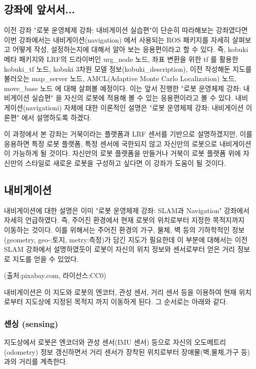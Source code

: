 \subsection{강좌에 앞서서...}

이전 강좌 "로봇 운영체제 강좌: 내비게이션 실습편"이 단순히 따라해보는 강좌였다면 이번 강좌에서는 내비게이션(navigation) 에서 사용되는 ROS 패키지를 자세히 살펴보고 어떻게 작성, 설정하는지에 대해서 알아 보는 응용편이라고 할 수 있다. 즉, kobuki 메타 패키지와 LRF의 드라이버인 urg\_node 노드, 좌표 변환을 위한 tf 를 활용한 kobuki\_tf 노드, kobuki 3차원 모델 정보(kobuki\_description), 이전 작성해둔 지도를 불러오는 map\_server 노드, AMCL(Adaptive Monte Carlo Localization) 노드, move\_base 노드 에 대해 살펴볼 예정이다. 이는 앞서 진행한 "로봇 운영체제 강좌: 내비게이션 실습편" 을 자신의 로봇에 적용해 볼 수 있는 응용편이라고 볼 수 있다. 내비게이션(navigationi) 자체에 대한 이론적인 설명은 "로봇 운영체제 강좌: 내비게이션 이론편" 에서 설명하도록 하겠다.

이 과정에서 본 강좌는 거북이라는 플랫폼과 LRF 센서를 기반으로 설명하겠지만, 이를 응용하면 특정 로봇 플랫폼, 특정 센서에 국한되지 않고 자신만의 로봇으로 내비게이션 이 가능하게 될 것이다. 자신만의 로봇 플랫폼을 만들거나 거북이 로봇 플랫폼 위에 자신만의 스타일로 새로운 로봇을 구성하고 싶다면 이 강좌가 도움이 될 것이다.

\subsection{내비게이션}

내비게이션에 대한 설명은 이미 "로봇 운영체제 강좌: SLAM과 Navigation" 강좌에서 자세히 언급하였다. 즉, 주어진 환경에서 현재 로봇의 위치로부터 지정한 목적지까지 이동하는 것이다. 이를 위해서는 주어진 환경의 가구, 물체, 벽 등의 기하학적인 정보 (geometry, geo-:토지, metry:측정)가 담긴 지도가 필요한데 이 부분에 대해서는 이전  SLAM 강좌에서 설명하였듯이 로봇이 자신의 위치 정보와 센서로부터 얻은 거리 정보로 지도를 얻을 수 있었다. 

(출처:pixabay.com, 라이선스:CC0)

내비게이션은 이 지도와 로봇의 엔코터, 관성 센서, 거리 센서 등을 이용하여 현재 위치로부터 지도상에 지정된 목적지 까지 이동하게 된다. 그 순서로는 아래와 같다.

\subsubsection{센싱 (sensing)}
지도상에서 로봇은 엔코더와 관성 센서(IMU 센서) 등으로 자신의 오도메트리(odometry) 정보 갱신하면서 거리 센서가 장착된 위치로부터 장애물(벽,물체,가구 등)과의 거리를 계측한다. 

